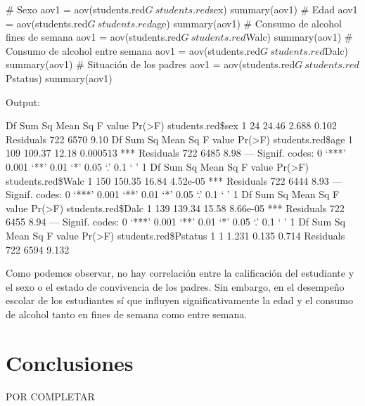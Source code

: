 \documentclass[12pt,a4paper]{article}
\begin{document}
\begin{spverbatim}
# Sexo
aov1 = aov(students.red$G ~ students.red$sex)
summary(aov1)
# Edad
aov1 = aov(students.red$G ~ students.red$age)
summary(aov1)
# Consumo de alcohol fines de semana
aov1 = aov(students.red$G ~ students.red$Walc)
summary(aov1)
# Consumo de alcohol entre semana
aov1 = aov(students.red$G ~ students.red$Dalc)
summary(aov1)
# Situación de los padres
aov1 = aov(students.red$G ~ students.red$Pstatus)
summary(aov1)

Output:

                  Df Sum Sq Mean Sq F value Pr(>F)
students.red\$sex   1     24   24.46   2.688  0.102
Residuals        722   6570    9.10               
                  Df Sum Sq Mean Sq F value   Pr(>F)    
students.red\$age   1    109  109.37   12.18 0.000513 ***
Residuals        722   6485    8.98                     
---
Signif. codes:  0 ‘***’ 0.001 ‘**’ 0.01 ‘*’ 0.05 ‘.’ 0.1 ‘ ’ 1
                   Df Sum Sq Mean Sq F value   Pr(>F)    
students.red\$Walc   1    150  150.35   16.84 4.52e-05 ***
Residuals         722   6444    8.93                     
---
Signif. codes:  0 ‘***’ 0.001 ‘**’ 0.01 ‘*’ 0.05 ‘.’ 0.1 ‘ ’ 1
                   Df Sum Sq Mean Sq F value   Pr(>F)    
students.red\$Dalc   1    139  139.34   15.58 8.66e-05 ***
Residuals         722   6455    8.94                     
---
Signif. codes:  0 ‘***’ 0.001 ‘**’ 0.01 ‘*’ 0.05 ‘.’ 0.1 ‘ ’ 1
                      Df Sum Sq Mean Sq F value Pr(>F)
students.red\$Pstatus   1      1   1.231   0.135  0.714
Residuals            722   6594   9.132

\end{spverbatim}

Como podemos observar, no hay correlación entre la calificación del estudiante y el sexo o el estado de convivencia de los padres. Sin embargo, en el desempeño escolar de los estudiantes sí que influyen significativamente la edad y el consumo de alcohol tanto en fines de semana como entre semana.


\section{Conclusiones}

{ POR COMPLETAR }


\newpage
 
 



	
\end{document}
